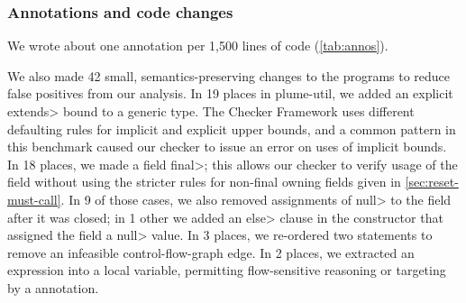 

\subsubsection{Annotations and code changes}\label{sec:annotations-and-code-changes}
\label{sec:annos}



We wrote about one annotation per 1,500 lines of code (\cref{tab:annos}).

We also
made 42 small, semantics-preserving changes to the programs to reduce
false positives from our analysis.
%
In 19 places in plume-util, we added an explicit \<extends> bound to a generic type.
The Checker Framework uses different defaulting rules for implicit and explicit
upper bounds, and a common pattern in this benchmark caused our checker to issue
an error on uses of implicit bounds.
%
In 18 places, we made a field \<final>; this allows our checker to verify usage
of the field without using the stricter rules for non-final owning fields given in \cref{sec:reset-must-call}.
In 9 of those cases, we also removed assignments of \<null> to the field after it was closed; in 1 other we added an \<else> clause in the constructor that assigned the field
a \<null> value.
%
In 3 places, we re-ordered two statements to remove an
infeasible control-flow-graph edge.
%
In 2 places, we extracted an expression into a local variable, permitting
flow-sensitive reasoning or targeting by a \CreatesMustCallFor annotation.

